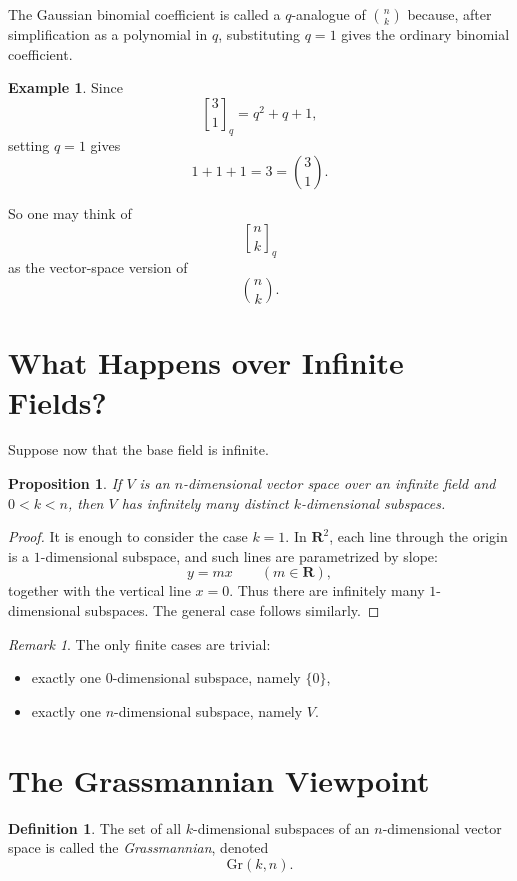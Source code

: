 \documentclass[11pt]{article}
\newtheorem{proposition}[theorem]{Proposition}
\theoremstyle{definition}
\newtheorem{definition}[theorem]{Definition}
\newtheorem{example}[theorem]{Example}
\theoremstyle{remark}
\newtheorem{remark}[theorem]{Remark}
\newcommand{\R}{\mathbf{R}}
\newcommand{\Gr}{\mathrm{Gr}}
\newcommand{\qbinom}[2]{\genfrac{[}{]}{0pt}{}{#1}{#2}_q}
\begin{document}
	The Gaussian binomial coefficient is called a \(q\)-analogue of \(\binom{n}{k}\) because, after simplification as a polynomial in \(q\), substituting \(q=1\) gives the ordinary binomial coefficient.
	
	\begin{example}
		Since
		\[
		\qbinom{3}{1}=q^2+q+1,
		\]
		setting \(q=1\) gives
		\[
		1+1+1=3=\binom{3}{1}.
		\]
	\end{example}
	
	So one may think of
	\[
	\qbinom{n}{k}
	\]
	as the vector-space version of
	\[
	\binom{n}{k}.
	\]
	
	\section{What Happens over Infinite Fields?}
	
	Suppose now that the base field is infinite.
	
	\begin{proposition}
		If \(V\) is an \(n\)-dimensional vector space over an infinite field and \(0<k<n\), then \(V\) has infinitely many distinct \(k\)-dimensional subspaces.
	\end{proposition}
	
	\begin{proof}
		It is enough to consider the case \(k=1\). In \(\R^2\), each line through the origin is a \(1\)-dimensional subspace, and such lines are parametrized by slope:
		\[
		y=mx \qquad (m\in \R),
		\]
		together with the vertical line \(x=0\). Thus there are infinitely many \(1\)-dimensional subspaces. The general case follows similarly.
	\end{proof}
	
	\begin{remark}
		The only finite cases are trivial:
		\begin{itemize}
			\item exactly one \(0\)-dimensional subspace, namely \(\{0\}\),
			\item exactly one \(n\)-dimensional subspace, namely \(V\).
		\end{itemize}
	\end{remark}
	
	\section{The Grassmannian Viewpoint}
	
	\begin{definition}
		The set of all \(k\)-dimensional subspaces of an \(n\)-dimensional vector space is called the \emph{Grassmannian}, denoted
		\[
		\Gr(k,n).
		\]
	\end{definition}
	
\end{document}
